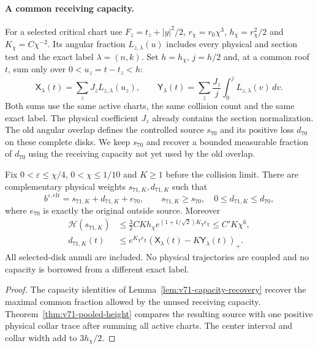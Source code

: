 \paragraph{A common receiving capacity.}
For a selected critical chart use $F_z=t_z+|y|^2/2$,
$r_\chi=r_0\chi^3$, $h_\chi=r_\chi^2/2$ and
$K_\chi=C\chi^{-2}$. Its angular fraction
$L_{z,\lambda}(u)$ includes every physical and section test and the
exact label $\lambda=(n,k)$. Set $h=h_\chi$, $j=h/2$ and, at a
common roof $t$, sum only over $0<u_z=t-t_z<h$:
\[
 \mathsf X_\lambda(t)=\sum_zJ_zL_{z,\lambda}(u_z),\qquad
 \mathsf Y_\lambda(t)=\sum_z\frac{J_z}{j}
                                  \int_0^jL_{z,\lambda}(v)\,dv.
\]
Both sums use the same active charts, the same collision count and
the same exact label. The physical coefficient $J_z$ already contains
the section normalization. The old angular overlap defines the
controlled source $s_{70}$ and its positive loss $d_{70}$ on these
complete disks. We keep $s_{70}$ and recover a bounded measurable
fraction of $d_{70}$ using the receiving capacity not yet used by
the old overlap.

\begin{leadtheorem}
\label{thm:intro-v71-recovery}
Fix $0<\varepsilon\le\chi/4$, $0<\chi\le1/10$ and $K\ge1$
before the collision limit. There are complementary physical weights
$s_{71,K},d_{71,K}$ such that
\[
 b^{\varepsilon,\mathrm{clr}}=s_{71,K}+d_{71,K}+e_{70},\qquad
 s_{71,K}\ge s_{70},\quad 0\le d_{71,K}\le d_{70},
\]
where $e_{70}$ is exactly the original outside source. Moreover
\begin{align*}
 \mathcal H(s_{71,K})
   &\le \tfrac32 CK h_\chi
              e^{(1+1/\sqrt2)K_\chi r_\chi}\le C'K\chi^6,\\
 d_{71,K}(t)&\le e^{K_\chi r_\chi}
                         (\mathsf X_\lambda(t)-K\mathsf Y_\lambda(t))_+.
\end{align*}
All selected-disk annuli are included. No physical trajectories are
coupled and no capacity is borrowed from a different exact label.
\end{leadtheorem}
\begin{proof}
The capacity identities of Lemma~\ref{lem:v71-capacity-recovery}
recover the maximal common fraction allowed by the unused receiving
capacity. Theorem~\ref{thm:v71-pooled-height} compares the resulting
source with one positive physical collar trace after summing all active
charts. The center interval and collar width add to $3h_\chi/2$.
\end{proof}

